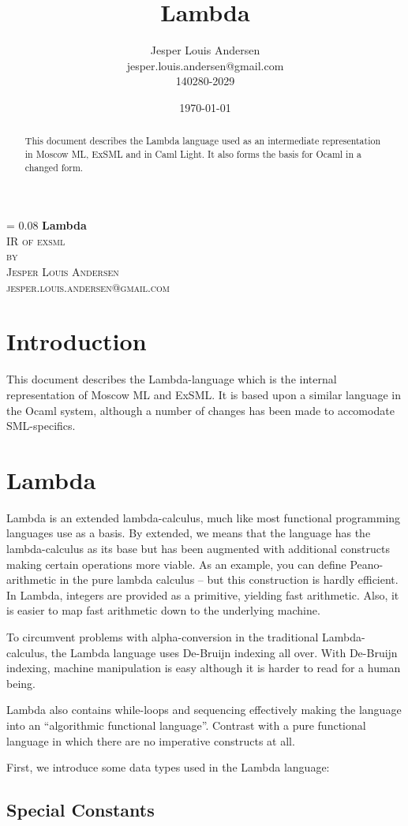 \documentclass[a4paper, oneside, 10pt, draft]{memoir}
\author{Jesper Louis
  Andersen\\jesper.louis.andersen@gmail.com\\140280-2029}
\title{Lambda}
\date{\today}
\makeatletter
\newlength{\drop}
\newcommand*{\titleM}{\begingroup%
  \drop = 0.08\textheight
  \centering
  {\Huge\bfseries Lambda}\\[\baselineskip]
  {\scshape IR of exsml}\\[\baselineskip]
  {\scshape by}\\[\baselineskip]
  {\large\scshape Jesper Louis Andersen\\jesper.louis.andersen@gmail.com}\par
  \endgroup}
\makeatother
\begin{document}
\newcommand{\janusz}{$\mathrm{JANUS}_0$}
\newcommand{\januso}{$\mathrm{JANUS}_1$}
\newcommand{\lift}[1]{\lfloor #1 \rfloor}
\newcommand{\NN}{\mathbb{N}}
\newcommand{\ZZ}{\mathbb{Z}}
\titleM{}
\begin{abstract}
This document describes the Lambda language used as an intermediate
representation in Moscow ML, ExSML and in Caml Light. It also forms
the basis for Ocaml in a changed form.
\end{abstract}
\listoffixmes
\chapter{Introduction}
This document describes the Lambda-language which is the internal
representation of Moscow ML and ExSML. It is based upon a similar
language in the Ocaml system, although a number of changes has been
made to accomodate SML-specifics.

\chapter{Lambda}

Lambda is an extended lambda-calculus, much like most functional
programming languages use as a basis. By extended, we means that the
language has the lambda-calculus as its base but has been augmented
with additional constructs making certain operations more viable. As
an example, you can define Peano-arithmetic in the pure lambda
calculus -- but this construction is hardly efficient. In Lambda,
integers are provided as a primitive, yielding fast arithmetic. Also,
it is easier to map fast arithmetic down to the underlying machine.

To circumvent problems with alpha-conversion in the traditional
Lambda-calculus, the Lambda language uses De-Bruijn indexing all
over. With De-Bruijn indexing, machine manipulation is easy although
it is harder to read for a human being.

Lambda also contains while-loops and sequencing effectively making
the language into an ``algorithmic functional language''. Contrast with
a pure functional language in which there are no imperative constructs
at all.

First, we introduce some data types used in the Lambda language:

\section{Special Constants}
\end{document}
